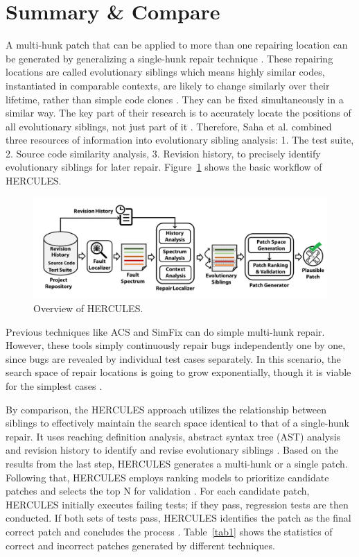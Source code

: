 \documentclass[runningheads]{llncs}
\begin{document}
\section{Summary \& Compare}
A multi-hunk patch that can be applied to more than one repairing location can be generated by generalizing a single-hunk repair technique \cite{0_ref_proc1}. These repairing locations are called evolutionary siblings which means highly similar codes, instantiated in comparable contexts, are likely to change similarly over their lifetime, rather than simple code clones \cite{0_ref_proc1}. They can be fixed simultaneously in a similar way. The key part of their research is to accurately locate the positions of all evolutionary siblings, not just part of it \cite{0_ref_proc1}. Therefore, Saha et al. combined three resources of information into evolutionary sibling analysis: 1. The test suite, 2. Source code similarity analysis, 3. Revision history, to precisely identify evolutionary siblings for later repair.
Figure~\ref{fig1} shows the basic workflow of HERCULES.
\begin{figure}
\includegraphics[width=\textwidth]{overview}
\caption{Overview of HERCULES.} \label{fig1}
\end{figure}

Previous techniques like ACS and SimFix can do simple multi-hunk repair. However, these tools simply continuously repair bugs independently one by one, since bugs are revealed by individual test cases separately. In this scenario, the search space of repair locations is going to grow exponentially, though it is viable for the simplest cases \cite{0_ref_proc1}.

By comparison, the HERCULES approach utilizes the relationship between siblings to effectively maintain the search space identical to that of a single-hunk repair. It uses reaching definition analysis, abstract syntax tree (AST) analysis and revision history to identify and revise evolutionary siblings \cite{0_ref_proc1}. Based on the results from the last step, HERCULES generates a multi-hunk or a single patch\cite{0_ref_proc1}. Following that, HERCULES employs ranking models to prioritize candidate patches and selects the top N for validation \cite{0_ref_proc1}. For each candidate patch, HERCULES initially executes failing tests; if they pass, regression tests are then conducted. If both sets of tests pass, HERCULES identifies the patch as the final correct patch and concludes the process \cite{0_ref_proc1}.
Table~\ref{tab1} shows the statistics of correct and incorrect patches generated by different techniques.
\end{document}
